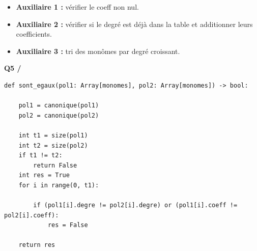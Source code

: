\documentclass[11pt,a4paper]{article}
\newcommand{\question}[1]{\par\medskip\noindent\textbf{#1}\quad}
\begin{document}
\begin{itemize}[leftmargin=2em, itemsep=2pt]
  \item[] \textbf{Auxiliaire 1 :} vérifier le coeff non nul.
  \item[] \textbf{Auxiliaire 2 :} vérifier si le degré est déjà dans la table
          et additionner leurs coefficients.
  \item[] \textbf{Auxiliaire 3 :} tri des monômes par degré croissant.
\end{itemize}

\question{Q5 /}

\begin{lstlisting}
def sont_egaux(pol1: Array[monomes], pol2: Array[monomes]) -> bool:

    pol1 = canonique(pol1)
    pol2 = canonique(pol2)

    int t1 = size(pol1)
    int t2 = size(pol2)
    if t1 != t2:
        return False
    int res = True
    for i in range(0, t1):

        if (pol1[i].degre != pol2[i].degre) or (pol1[i].coeff != pol2[i].coeff):
            res = False

    return res
\end{lstlisting}
\end{document}
